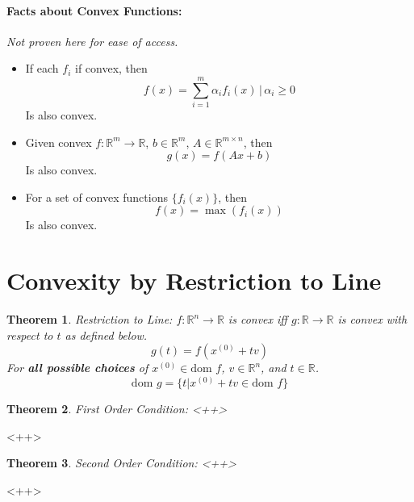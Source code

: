 \documentclass[a4paper,12pt]{report}
\def\reals{\mathbb{R}}
\newtheorem{theorem}{Theorem}
\begin{document}
\paragraph{Facts about Convex Functions: } \textit{Not proven here for ease of access.} 
\begin{itemize}
\item If each $f_i$ if convex, then 
\begin{equation}
f(x) = \sum_{i=1}^{m} \alpha_i f_i(x)\, | \, \alpha_i \geq 0
\end{equation}
Is also convex.

\item Given convex $f:\mathbb R^m \to \mathbb R$, $b\in \mathbb R^m$, $A\in \mathbb R^{m\times n}$, then 
\begin{equation}
g(x) = f(Ax + b)
\end{equation}
Is also convex. 

\item For a set of convex functions $\{f_i(x)\}$, then 
\begin{equation}
f(x) = \max(f_i(x))
\end{equation}
Is also convex.
\end{itemize}


\section{Convexity by Restriction to Line}

\begin{theorem}{Restriction to Line: }
$f:\reals^n \to \reals$ is convex iff $g:\reals \to \reals$ is convex with respect to $t$ as defined below.
\begin{equation}
g(t) = f(x^{(0)} + tv)
\end{equation}
For \textbf{all possible choices} of $x^{(0)} \in \text{dom }f$, $v\in \reals^n$, and $t\in \reals$.
\begin{equation}
\text{dom }g = \{t | x^{(0)} +tv \in \text{dom }f \}
\end{equation}
\end{theorem}


\begin{theorem}{First Order Condition: }
<++>
\end{theorem}
<++>


\begin{theorem}{Second Order Condition: }
<++>
\end{theorem}
<++>
\end{document}
